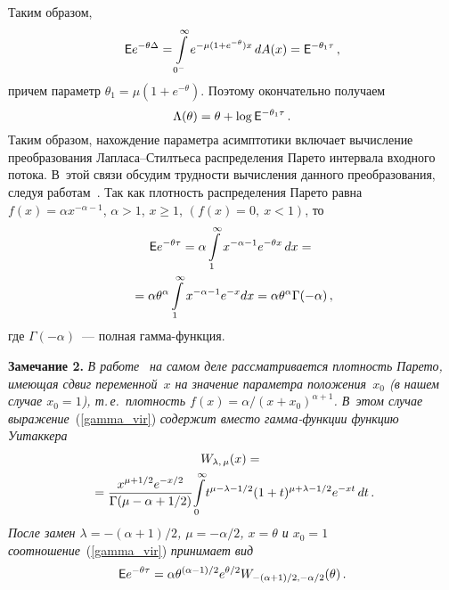 \begin{multicols}{2}
Таким образом,
\begin{equation*}
{\sf E}  e^{-\theta \Delta}=\int\limits_{0^-}^\infty
e^{-\mu(1+e^{-\theta})x}\,dA(x)= {\sf E} ^{-\theta_{1} \tau}\,,
\end{equation*}
причем параметр  $\theta_1=\mu(1+e^{-\theta})$.
 Поэтому окончательно  получаем
\begin{equation*}
\Lambda(\theta)=\theta+\log {\sf E} ^{-\theta_{1} \tau}\,.
\end{equation*}
  Таким образом,  нахождение параметра асимптотики включает
 вычисление преобразования Лапласа--Стилтьеса  распределения Парето интервала входного потока. В~этой
связи обсудим трудности вычисления данного преобразования, следуя
работам~\cite{Starobinski&Sidi2000, Nadarajah&Kotz2006}. Так
  как плотность распределения Парето равна $f(x)=\alpha
x^{-\alpha-1}$, $\alpha>1$, $x\ge 1$, $(f(x)=0,\ x<1)$,  то
\begin{multline}
{\sf E} e^{-\theta \tau}  =  \alpha \int\limits_{1}^{\infty} x^{-\alpha - 1}
e^{-\theta x}\,dx ={}\\
{}=  \alpha \theta^{\alpha}
\int\limits_{1}^{\infty}x^{-\alpha - 1}e^{-x}dx = \alpha
             \theta^{\alpha} \Gamma(-\alpha)\,,
\label{gamma_vir}
\end{multline}
где $\Gamma(-\alpha)$~--- полная гамма-функция.


\medskip

\noindent
\textbf{Замечание 2.} {\it В работе}~\cite{Nadarajah&Kotz2006} {\it на самом
деле рассматривается плотность Парето, имеющая сдвиг переменной~$x$
на значение параметра положения~$x_0$ (в нашем случае $x_0=1$), т.\,е.\
 плотность $f(x)=\alpha / (x+x_0)^{\alpha +1}$. В~этом случае
выражение}~(\ref{gamma_vir})  {\it содержит  вместо гамма-функции функцию
Уитаккера
\begin{multline*}
W_{\lambda,\, \mu} (x) ={}\\
{}=
\displaystyle\frac{\displaystyle x^{\mu+1/2}e^{-x/2}\mathstrut}{\displaystyle \Gamma(\mu-\alpha
+1/2)\mathstrut}\!\int\limits_{0}^{\infty}\!t^{\mu - \lambda
-1/2}(1+t)^{\mu+\lambda-1/2}e^{-xt}\,dt\,.\hspace*{-1.3917pt}
\end{multline*}
После замен  $\lambda = -(\alpha+1)/2$, $\mu =
-\alpha/2$, $x=\theta$ и $x_0=1$ соотношение}~(\ref{gamma_vir})
{\it принимает вид
\begin{equation*}
{\sf E} e^{-\theta\tau} =  \alpha \theta^{(\alpha
-1)/2}e^{\theta/2}W_{-(\alpha+1)/2, -\alpha/2}(\theta)\,.
\end{equation*}
}



\end{multicols}
